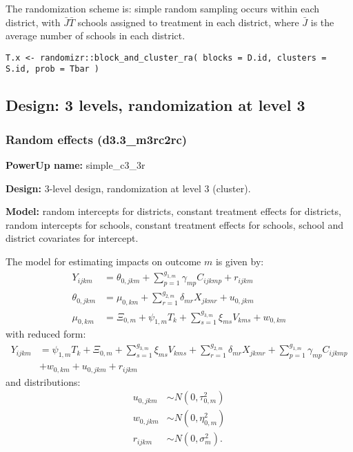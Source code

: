 \documentclass[12pt]{article}
\begin{document}
The randomization scheme is: simple random sampling occurs within each district, with $\bar{J} \bar{T}$ schools assigned to treatment in each district, where $\bar{J}$ is the average number of schools in each district.
\begin{verbatim}
T.x <- randomizr::block_and_cluster_ra( blocks = D.id, clusters = S.id, prob = Tbar )
\end{verbatim}



\newpage 
\subsection{Design: 3 levels, randomization at level 3}


\subsubsection{Random effects (d3.3\_m3rc2rc)}

\textbf{PowerUp name:} simple\_c3\_3r

\textbf{Design:} 3-level design, randomization at level 3 (cluster).

\textbf{Model:} random intercepts for districts, constant treatment effects for districts, random intercepts for schools, constant treatment effects for schools, school and district covariates for intercept.

The model for estimating impacts on outcome $m$ is given by:
\begin{align}\label{eqn:bi12c_model}
Y_{ijkm} &=  \theta_{0,jkm} + \sum_{p=1}^{g_{1,m}} \gamma_{mp} C_{ijkmp} + r_{ijkm}\\
\nonumber \theta_{0,jkm} &= \mu_{0,km} + \sum_{r=1}^{g_{2,m}} \delta_{mr} X_{jkmr} + u_{0,jkm}\\
\nonumber \mu_{0,km}  &= \Xi_{0,m} + \psi_{1,m} T_{k} + \sum_{s=1}^{g_{3,m}} \xi_{ms} V_{kms} + w_{0,km}
\end{align}
with reduced form:
\begin{align}
Y_{ijkm} &= \psi_{1,m} T_{k} + \Xi_{0,m} + \sum_{s=1}^{g_{3,m}} \xi_{ms} V_{kms} + \sum_{r=1}^{g_{2,m}} \delta_{mr} X_{jkmr} + \sum_{p=1}^{g_{1,m}} \gamma_{mp} C_{ijkmp}\\
\nonumber &+ w_{0,km} + u_{0,jkm} + r_{ijkm}
\end{align}
and distributions:
\begin{align}
u_{0,jkm} &\sim N\left(0, \tau^2_{0,m}\right)\\
\nonumber w_{0,jkm} &\sim N\left(0, \eta^2_{0,m}\right)\\
\nonumber r_{ijkm} &\sim N\left(0, \sigma^2_m\right).
\end{align}
\end{document}
